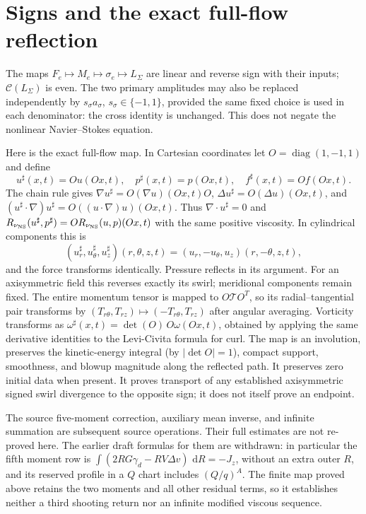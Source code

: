 \documentclass[11pt]{article}
\newcommand{\dd}{\,\mathrm d}
\newcommand{\Cov}{\mathcal C}
\begin{document}
\section{Signs and the exact full-flow reflection}
The maps $F_e\mapsto M_e\mapsto\sigma_e\mapsto L_\Sigma$ are linear
and reverse sign with their inputs; $\Cov(L_\Sigma)$ is even.
The two primary amplitudes may also be replaced independently by
$s_\sigma a_\sigma$, $s_\sigma\in\{-1,1\}$, provided the same fixed
choice is used in each denominator: the cross identity is unchanged.
This does not negate the nonlinear Navier--Stokes equation.

Here is the exact full-flow map. In Cartesian coordinates let
$O=\operatorname{diag}(1,-1,1)$ and define
\[
 u^\sharp(x,t)=O u(Ox,t),\quad
 p^\sharp(x,t)=p(Ox,t),\quad f^\sharp(x,t)=O f(Ox,t).
\]
The chain rule gives
$\nabla u^\sharp=O(\nabla u)(Ox,t)O$,
$\Delta u^\sharp=O(\Delta u)(Ox,t)$, and
$(u^\sharp\cdot\nabla)u^\sharp
 =O((u\cdot\nabla)u)(Ox,t)$.
Thus $\nabla\cdot u^\sharp=0$ and
$R_{\nu_{\rm NS}}(u^\sharp,p^\sharp)=O R_{\nu_{\rm NS}}(u,p)(Ox,t)$
with the same positive viscosity.
In cylindrical components this is
\[
 (u_r^\sharp,u_\theta^\sharp,u_z^\sharp)(r,\theta,z,t)
 =(u_r,-u_\theta,u_z)(r,-\theta,z,t),
\]
and the force transforms identically. Pressure reflects in its argument.
For an axisymmetric field this reverses exactly its swirl; meridional
components remain fixed. The entire momentum tensor is mapped to
$O\mathcal T O^T$, so its radial--tangential pair transforms by
$(T_{r\theta},T_{rz})\mapsto(-T_{r\theta},T_{rz})$ after angular
averaging. Vorticity transforms as
$\omega^\sharp(x,t)=\det(O)\,O\omega(Ox,t)$, obtained by applying
the same derivative identities to the Levi-Civita formula for curl.
The map is an involution, preserves the kinetic-energy integral
(by $|\det O|=1$), compact support, smoothness, and blowup magnitude
along the reflected path. It preserves zero initial data when present.
It proves transport of any established axisymmetric signed swirl
divergence to the opposite sign; it does not itself prove an endpoint.

The source five-moment correction, auxiliary mean inverse, and infinite
summation are subsequent source operations. Their full estimates are
not re-proved here. The earlier draft formulas for them are withdrawn:
in particular the fifth moment row is
$\int(2RG\gamma_d-RV\Delta v)\,\dd R=-J_z$, without an extra outer
$R$, and its reserved profile in a $Q$ chart includes $(Q/q)^A$.
The finite map proved above retains the two moments and all other
residual terms, so it establishes neither a third shooting return nor
an infinite modified viscous sequence.
\end{document}
